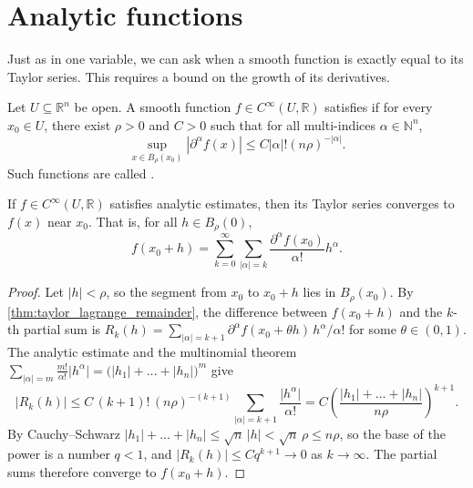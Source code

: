 \section{Analytic functions}
\label{sec:analytic_functions}

Just as in one variable, we can ask when a smooth function is exactly equal to its Taylor series. This requires a bound on the growth of its derivatives.

\begin{definition}
\label{def:analytic_estimates}
Let $U \subseteq \mathbb{R}^n$ be open. A smooth function $f \in C^\infty(U, \mathbb{R})$ satisfies  if for every $x_0 \in U$, there exist $\rho > 0$ and $C > 0$ such that for all multi-indices $\alpha \in \mathbb{N}^n$,
\[ \sup_{x \in B_\rho(x_0)} |\partial^\alpha f(x)| \leq C |\alpha|! \left(n\rho\right)^{-|\alpha|}. \]
Such functions are called .
\end{definition}

\begin{theorem}
\label{thm:convergence_taylor_series}
If $f \in C^\infty(U, \mathbb{R})$ satisfies analytic estimates, then its Taylor series converges to $f(x)$ near $x_0$. That is, for all $h \in B_\rho(0)$,
\[ f(x_0+h) = \sum_{k=0}^\infty \sum_{|\alpha|=k} \frac{\partial^\alpha f(x_0)}{\alpha!} h^\alpha. \]
\end{theorem}

\begin{proof}
Let $\lvert h\rvert < \rho$, so the segment from $x_0$ to $x_0+h$ lies in $B_\rho(x_0)$. By
\cref{thm:taylor_lagrange_remainder}, the difference between $f(x_0+h)$ and the $k$-th partial sum
is $R_k(h) = \sum_{\lvert\alpha\rvert=k+1}\partial^\alpha f(x_0+\theta h)\,h^\alpha/\alpha!$ for
some $\theta \in (0,1)$. The analytic estimate and the multinomial theorem
$\sum_{\lvert\alpha\rvert = m}\frac{m!}{\alpha!}\lvert h^\alpha\rvert = \big(\lvert h_1\rvert +
\dots + \lvert h_n\rvert\big)^m$ give
\[\lvert R_k(h)\rvert \leq C\,(k+1)!\,(n\rho)^{-(k+1)}\sum_{\lvert\alpha\rvert=k+1}
  \frac{\lvert h^\alpha\rvert}{\alpha!}
  = C\left(\frac{\lvert h_1\rvert + \dots + \lvert h_n\rvert}{n\rho}\right)^{k+1}.\]
By Cauchy--Schwarz $\lvert h_1\rvert + \dots + \lvert h_n\rvert \leq \sqrt n\,\lvert h\rvert <
\sqrt n\,\rho \leq n\rho$, so the base of the power is a number $q < 1$, and
$\lvert R_k(h)\rvert \leq Cq^{k+1} \to 0$ as $k \to \infty$. The partial sums therefore converge to
$f(x_0+h)$.
\end{proof}

